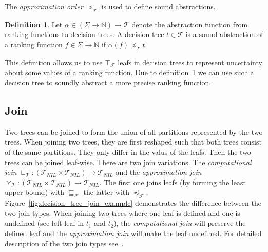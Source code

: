 \documentclass[11pt,a4paper,titlepage]{article}
\theoremstyle{definition}
\newtheorem{definition}{Definition}[section]
\begin{document}
The \textit{approximation order} $\preceq_{\mathcal{T}}$ is used to define sound abstractions.

\begin{definition}\label{def:sound_abstraction}
    Let $\alpha \in (\Sigma \rightarrow \mathbb{N}) \rightarrow \mathcal{T}$ denote the abstraction function from ranking functions to decision trees.
    A decision tree $t \in \mathcal{T}$ is a sound abstraction of a ranking function $f \in \Sigma \rightarrow \mathbb{N}$ if
    $\alpha(f) \preceq_{\mathcal{T}} t$.
\end{definition}

This definition allows us to use $\top_\mathcal{F}$ leafs in decision trees to represent uncertainty about some values of a ranking function.
Due to definition~\ref{def:sound_abstraction} we can use such a decision tree to soundly abstract a more precise ranking function.


\subsection{Join}\label{sec:tree_join}
Two trees can be joined to form the union of all partitions represented by the two trees. When joining two trees, they are first reshaped such
that both trees consist of the same partitions. They only differ in the valus of the leafs. Then the two trees can be joined leaf-wise. 
There are two join variations. 
The \textit{computational join} $\sqcup_{\mathcal{T}} \colon (\mathcal{T}_{NIL} \times \mathcal{T}_{NIL}) \rightarrow \mathcal{T}_{NIL}$
and the \textit{approximation join} $\curlyvee_{\mathcal{T}} \colon (\mathcal{T}_{NIL} \times \mathcal{T}_{NIL}) \rightarrow \mathcal{T}_{NIL}$. 
The first one joins leafs (by forming the least upper bound) with $\sqsubseteq_{\mathcal{F}}$ the latter with $\preceq_{\mathcal{F}}$. 
Figure~\ref{fig:decision_tree_join_example} demonstrates the difference between the two join types. 
When joining two trees where one leaf is defined and one is undefined 
(see left leaf in $t_1$ and $t_2$), the \textit{computational join} will preserve the defined leaf
and the \textit{approximation join} will make the leaf undefined. For detailed description of the two join types see~\cite{UrbanPhd}.
\end{document}
